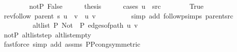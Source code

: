 \begin{isabellebody}
\ \ \isamarkupfalse%
\isanewline
\ \ \ \ \isamarkupfalse%
\ not{\isacharunderscore}{\kern0pt}P{\isacharprime}{\kern0pt}{\isacharcolon}{\kern0pt}\ False\isanewline
\ \ \ \ \isamarkupfalse%
\ {\isacharquery}{\kern0pt}thesis\isanewline
\ \ \ \ \isamarkupfalse%
\ {\isacharparenleft}{\kern0pt}cases\ {\isachardoublequoteopen}u\ {\isacharequal}{\kern0pt}\ src{\isachardoublequoteclose}{\isacharparenright}{\kern0pt}\isanewline
\ \ \ \ \ \ \isamarkupfalse%
\ True\isanewline
\ \ \ \ \ \ \isamarkupfalse%
\ {\isachardoublequoteopen}rev{\isacharunderscore}{\kern0pt}follow\ {\isacharparenleft}{\kern0pt}parent\ s{\isacharparenright}{\kern0pt}\ u\ {\isacharat}{\kern0pt}\ {\isacharbrackleft}{\kern0pt}v{\isacharbrackright}{\kern0pt}\ {\isacharequal}{\kern0pt}\ {\isacharbrackleft}{\kern0pt}u{\isacharcomma}{\kern0pt}\ v{\isacharbrackright}{\kern0pt}{\isachardoublequoteclose}\isanewline
\ \ \ \ \ \ \ \ \isamarkupfalse%
\ {\isacharparenleft}{\kern0pt}simp\ add{\isacharcolon}{\kern0pt}\ follow{\isacharunderscore}{\kern0pt}psimps\ parent{\isacharunderscore}{\kern0pt}src{\isacharparenright}{\kern0pt}\isanewline
\ \ \ \ \ \ \isamarkupfalse%
\ \isamarkupfalse%
\ {\isachardoublequoteopen}alt{\isacharunderscore}{\kern0pt}list\ P{\isacharprime}{\kern0pt}{\isacharprime}{\kern0pt}\ {\isacharparenleft}{\kern0pt}Not\ {\isasymcirc}\ P{\isacharprime}{\kern0pt}{\isacharprime}{\kern0pt}{\isacharparenright}{\kern0pt}\ {\isacharparenleft}{\kern0pt}edges{\isacharunderscore}{\kern0pt}of{\isacharunderscore}{\kern0pt}path\ {\isacharbrackleft}{\kern0pt}u{\isacharcomma}{\kern0pt}\ v{\isacharbrackright}{\kern0pt}{\isacharparenright}{\kern0pt}{\isachardoublequoteclose}\isanewline
\ \ \ \ \ \ \ \ \isamarkupfalse%
\ not{\isacharunderscore}{\kern0pt}P{\isacharprime}{\kern0pt}\ alt{\isacharunderscore}{\kern0pt}list{\isacharunderscore}{\kern0pt}step\ alt{\isacharunderscore}{\kern0pt}list{\isacharunderscore}{\kern0pt}empty\isanewline
\ \ \ \ \ \ \ \ \isamarkupfalse%
\ {\isacharparenleft}{\kern0pt}fastforce\ simp\ add{\isacharcolon}{\kern0pt}\ assms{\isacharparenleft}{\kern0pt}{}{\isacharparenright}{\kern0pt}\ P{\isacharunderscore}{\kern0pt}P{\isacharprime}{\kern0pt}{\isacharprime}{\kern0pt}{\isacharunderscore}{\kern0pt}cong{\isacharbrackleft}{\kern0pt}symmetric{\isacharbrackright}{\kern0pt}{\isacharparenright}{\kern0pt}\isanewline
\ \ \ \ \ \ \isamarkupfalse%
\ \isamarkupfalse%

\end{isabellebody}
